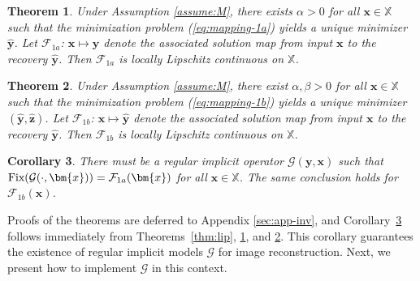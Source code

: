 \documentclass{amsart} %
\def\eqref#1{equation~\ref{#1}}
\def\vx{{\bm{x}}}
\def\vy{{\bm{y}}}
\def\vz{{\bm{z}}}
\def\sX{{\mathbb{X}}}
\def\cF{{\mathcal{F}}}
\def\cG{{\mathcal{G}}}
\newtheorem{theorem}{Theorem}[section]
\newtheorem{corollary}[theorem]{Corollary}
\theoremstyle{definition}
\theoremstyle{remark}
\renewcommand{\eqref}[1]{\textup{(\ref{#1})}}
\begin{document}
\begin{theorem}
\label{thm:inverse-lip-1a}
Under Assumption \ref{assume:M}, there exists $\alpha > 0$ for all $\vx \in \sX$ such that the minimization problem \eqref{eq:mapping-1a} yields a unique minimizer $\hat{\vy}$. Let $\cF_{1a}$: $\vx \mapsto \hat{\vy}$ denote the associated solution map from input $\vx$ to the recovery $\hat{\vy}$. Then $\cF_{1a}$ is locally Lipschitz continuous on $\sX$.
\end{theorem}

\begin{theorem}
\label{thm:inverse-lip-1b}
Under Assumption \ref{assume:M}, there exist $\alpha,\beta > 0$ for all $\vx \in \sX$ such that the minimization problem \eqref{eq:mapping-1b} yields a unique minimizer $(\hat{\vy},\hat{\vz})$. Let $\cF_{1b}$: $\vx \mapsto \hat{\vy}$ denote the associated solution map from input $\vx$ to the recovery $\hat{\vy}$. Then $\cF_{1b}$ is locally Lipschitz continuous on $\sX$.
\end{theorem}



\begin{corollary}
\label{cor:inverse-prob}
There must be a regular implicit operator $\cG(\vy,\vx)$ such that \(\textup{Fix}(\cG(\cdot,\vx)) = \cF_{1a}(\vx)\) for all $\vx\in\sX$. The same conclusion holds for $\cF_{1b}(\vx)$.
\end{corollary}


Proofs of the theorems are deferred to Appendix \ref{sec:app-inv}, and Corollary~\ref{cor:inverse-prob} follows immediately from Theorems~\ref{thm:lip}, \ref{thm:inverse-lip-1a}, and \ref{thm:inverse-lip-1b}. This corollary guarantees the existence of regular implicit models $\cG$ for image reconstruction. Next, we present how to implement $\cG$ in this context.
\end{document}
